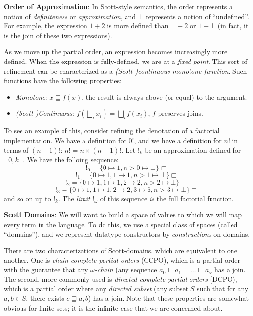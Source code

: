 \documentclass{article}
\begin{document}
\textbf{Order of Approximation}: In Scott-style semantics, the order
represents a notion of \emph{definiteness} or \emph{approximation},
and $\bot$ represents a notion of ``undefined''.  For example, the
expression $1 + 2$ is more defined than $\bot + 2$ or $1 + \bot$ (in
fact, it is the join of these two expressions).

As we move up the partial order, an expression becomes increasingly
more defined.  When the expression is fully-defined, we are at a
\emph{fixed point}.  This sort of refinement can be characterized as a
\emph{(Scott-)continuous monotone function}.  Such functions have the
following properties:
\begin{itemize}
  \item \emph{Monotone}: $x \sqsubseteq f(x)$, the result is always
    above (or equal) to the argument.
  \item \emph{(Scott-)Continuous}: $f(\bigsqcup_ix_i) =
    \bigsqcup_if(x_i)$, $f$ preserves joins.
\end{itemize}
To see an example of this, consider refining the denotation of a
factorial implementation.  We have a definition for $0!$, and we have
a definition for $n!$ in terms of $(n-1)!$: $n! = n\times(n-1)!$.  Let
$!_k$ be an approximation defined for $[0,k]$.  We have the folloing
sequence:
\[!_0 = \{ 0 \mapsto 1, n > 0 \mapsto \bot \} \sqsubset\]
\[!_1 = \{ 0 \mapsto 1, 1 \mapsto 1, n > 1 \mapsto \bot \} \sqsubset\]
\[!_2 = \{ 0 \mapsto 1, 1 \mapsto 1, 2 \mapsto 2, n > 2 \mapsto \bot \} \sqsubset\]
\[!_3 = \{ 0 \mapsto 1, 1 \mapsto 1, 2 \mapsto 2, 3 \mapsto 6, n > 3 \mapsto \bot \} \sqsubset\]
and so on up to $!_k$.  The \emph{limit} $!_{\omega}$ of this sequence
\emph{is} the full factorial function.

\textbf{Scott Domains}: We will want to build a space of values to
which we will map every term in the language.  To do this, we use a
special class of spaces (called ``domains''), and we represent
datatype constructors by \emph{constructions} on domains.

There are two characterizations of Scott-domains, which are equivalent
to one another.  One is \emph{chain-complete partial orders} (CCPO),
which is a partial order with the guarantee that any
\emph{$\omega$-chain} (any sequence $a_0 \sqsubseteq a_1 \sqsubseteq
\ldots \sqsubseteq a_\omega$ has a join.  The second, more commonly
used is \emph{directed-complete partial orders} (DCPO), which is a
partial order where any \emph{directed subset} (any subset $S$ such
that for any $a, b \in S$, there exists $c \sqsupseteq a, b$) has a
join.  Note that these properties are somewhat obvious for finite
sets; it is the infinite case that we are concerned about.
\end{document}
